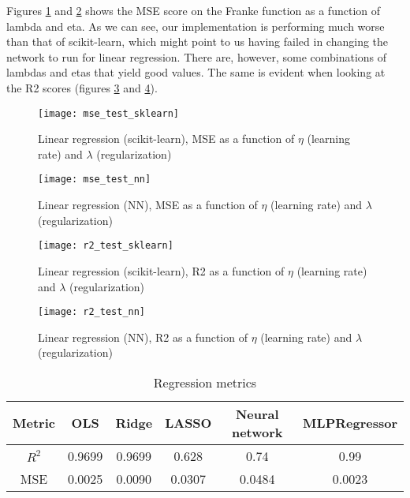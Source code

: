 \documentclass[11pt,english, A4]{article}
\begin{document}
Figures \ref{fig:mse_test_sklearn} and \ref{fig:mse_test_nn} shows the MSE score on the Franke function as a function of lambda and eta. As we can see, our implementation is performing much worse than that of scikit-learn, which might point to us having failed in changing the network to run for linear regression. There are, however, some combinations of lambdas and etas that yield good values. The same is evident when looking at the R2 scores (figures \ref{fig:r2_test_sklearn} and \ref{fig:r2_test_nn}).

\begin{figure}[H]
\begin{center}
  \texttt{[image: mse\_test\_sklearn]}
  \caption{Linear regression (scikit-learn), MSE as a function of $\eta$ (learning rate) and $\lambda$ (regularization)}
  \label{fig:mse_test_sklearn}
  \end{center}
\end{figure}

\begin{figure}[H]
\begin{center}
  \texttt{[image: mse\_test\_nn]}
  \caption{Linear regression (NN), MSE as a function of $\eta$ (learning rate) and $\lambda$ (regularization)}
  \label{fig:mse_test_nn}
  \end{center}
\end{figure}

\begin{figure}[H]
\begin{center}
  \texttt{[image: r2\_test\_sklearn]}
  \caption{Linear regression (scikit-learn), R2 as a function of $\eta$ (learning rate) and $\lambda$ (regularization)}
  \label{fig:r2_test_sklearn}
  \end{center}
\end{figure}

\begin{figure}[H]
\begin{center}
  \texttt{[image: r2\_test\_nn]}
  \caption{Linear regression (NN), R2 as a function of $\eta$ (learning rate) and $\lambda$ (regularization)}
  \label{fig:r2_test_nn}
  \end{center}
\end{figure}

\begin{center}
\begin{table}
 \begin{tabular}{|c | c c c c c|} 
 \hline
 Metric & OLS & Ridge & LASSO & \textbf{Neural network} & \textbf{MLPRegressor} \\ [0.5ex] 
 \hline
$R^{2}$ & 0.9699 & 0.9699 & 0.628 & 0.74 & 0.99 \\ 
 \hline
 MSE & 0.0025 & 0.0090 & 0.0307 & 0.0484 & 0.0023  \\ [1ex] 
 \hline 
 \end{tabular}
 \caption{Regression metrics}
 \label{tab:reg_mets}
 \end{table} 
\end{center}
\end{document}
